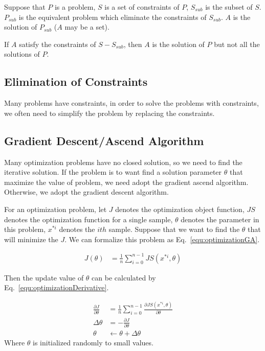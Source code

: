 \documentclass[runningheads,openany]{xhlPaper}
\begin{document}
\begin{theorem}
\label{theo:loseConstraintProblem}
Suppose that $P$ is a problem, $S$ is a set of constraints of $P$, $S_{sub}$ is the subset of $S$. $P_{sub}$ is the equivalent problem which eliminate the constraints of $S_{sub}$. $A$ is the solution of $P_{sub}$ ($A$ may be a set). 

If $A$ satisfy the constraints of $S - S_{sub}$, then $A$ is the solution of $P$ but not all the solutions of $P$.
\end{theorem}

\subsection{Elimination of Constraints}
Many problems have constraints, in order to solve the problems with constraints, we often need to simplify the problem by replacing the constraints.

\subsection{Gradient Descent/Ascend Algorithm}
\label{sec:optimizationGA}
Many optimization problems have no closed solution, so we need to find the iterative solution. If the problem is to want find a solution parameter $\theta$ that maximize the value of problem, we need adopt the gradient ascend algorithm. Otherwise, we adopt the gradient descent algorithm. 

For an optimization problem, let $J$ denotes the optimization object function, $JS$ denotes the optimization function for a single sample, $\theta$ denotes the parameter in this problem, $x^{* i}$ denotes the $ith$ sample. Suppose that we want to find the $\theta$ that will minimize the $J$. We can formalize this problem as Eq.~\ref{equ:optimizationGA}. 

\begin{equation}
\label{equ:optimizationGA}
\begin{aligned}
J\left( \theta  \right) &= \frac{1}{n}\sum\limits_{i = 0}^{n - 1} {JS\left( {{x^{* i}},\theta } \right)} 
\end{aligned}
\end{equation}

Then the update value of $\theta$ can be calculated by Eq.~\ref{equ:optimizationDerivative}.

\begin{equation}
\label{equ:optimizationDerivative}
\begin{aligned}
\frac{{\partial J}}{{\partial \theta }} &= \frac{1}{n}\sum\limits_{i = 0}^{n - 1} {\frac{{\partial JS\left( {{x^{ * i}},\theta } \right)}}{{\partial \theta }}}\\
\Delta \theta  &=  - \frac{{\partial J}}{{\partial \theta }}\\
\theta  &\leftarrow \theta  + \Delta \theta 
\end{aligned}
\end{equation}
Where $\theta$ is initialized randomly to small values.
\end{document}
